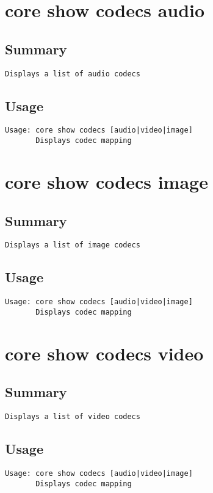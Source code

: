 \section{core show codecs audio}
\subsection{Summary}
\begin{verbatim}
Displays a list of audio codecs
\end{verbatim}
\subsection{Usage}
\begin{verbatim}
Usage: core show codecs [audio|video|image]
       Displays codec mapping

\end{verbatim}


\section{core show codecs image}
\subsection{Summary}
\begin{verbatim}
Displays a list of image codecs
\end{verbatim}
\subsection{Usage}
\begin{verbatim}
Usage: core show codecs [audio|video|image]
       Displays codec mapping

\end{verbatim}


\section{core show codecs video}
\subsection{Summary}
\begin{verbatim}
Displays a list of video codecs
\end{verbatim}
\subsection{Usage}
\begin{verbatim}
Usage: core show codecs [audio|video|image]
       Displays codec mapping

\end{verbatim}


